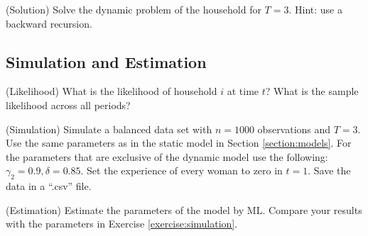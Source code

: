 \begin{exercise} (Solution)
Solve the dynamic problem of the household for $T=3$. Hint: use a backward recursion.
\end{exercise}

\subsection{Simulation and Estimation}

\begin{exercise} (Likelihood)
What is the likelihood of household $i$ at time $t$? What is the sample likelihood across all periods?
\end{exercise}

\begin{exercise} (Simulation) \label{exercise:simulation}
Simulate a balanced data set with $n = 1000$ observations and $T=3$. Use the same parameters as in the static model in Section \ref{section:models}. For the parameters that are exclusive of the dynamic model use the following: $\gamma_2 = 0.9,\delta = 0.85$. Set the experience of every woman to zero in $t=1$. Save the data in a ``.csv'' file.
\end{exercise}

\begin{exercise} (Estimation)
Estimate the parameters of the model by ML. Compare your results with the parameters in Exercise \ref{exercise:simulation}.
\end{exercise} 